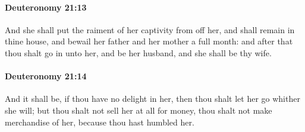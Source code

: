 		\paragraph{Deuteronomy 21:13} %
			\label{DEUTERONOMY-21-13}

			And she shall put the raiment of her captivity from off her, and shall remain in thine house, and bewail her father and her mother a full month: and after that thou shalt go in unto her, and be her husband, and she shall be thy wife.


		\paragraph{Deuteronomy 21:14} %
			\label{DEUTERONOMY-21-14}

			And it shall be, if thou have no delight in her, then thou shalt let her go whither she will; but thou shalt not sell her at all for money, thou shalt not make merchandise of her, because thou hast humbled her.

